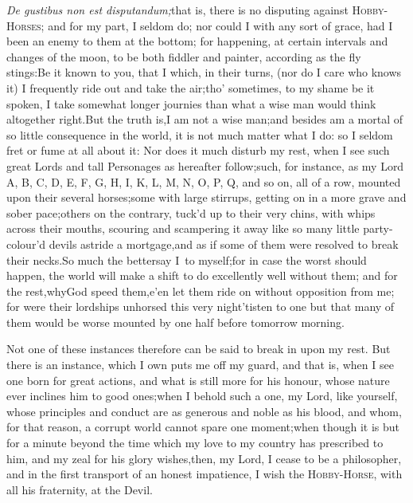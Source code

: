 \documentclass{article}
\begin{document}
\quad\tsk \textit{De gustibus non est
disputandum;}\break\tsk  that is, there is no disputing against
\textsc{Hobby-Horses}; and for my part, I
seldom do; nor could I with any sort of grace, had I been an enemy
to them at the bottom; for happening, at certain intervals and
changes of the moon, to be both fiddler and painter, according as
the fly stings:\tsk  Be it known to you, that I
which, in their turns, (nor do I care who knows
it) I frequently ride out and take 
the air;\tsk  tho’ sometimes, to my shame\break
be it spoken, I take somewhat longer\break
journies than what a wise man would\break
think altogether right.\tsk  But the truth\break
is,\tsk  I am not a wise man;\tsk  and besides am a mortal of so little consequence in the world,
it is not much matter what I do: so I seldom fret or fume at all
about it: Nor does it much disturb my rest, when I see such great
Lords and tall Personages as hereafter follow;\tsk  such, for
instance, as my Lord A, B, C, D, E, F, G, H, I, K, L, M, N, O, P,
Q, and so on, all of a row, mounted upon their several
horses;\tsk  some with large stirrups, getting on in a more grave
and sober pace;\tsh  others on the contrary, tuck’d up to
their very chins, with whips across their mouths, scouring and
scampering it away like so many little party-colour’d devils
astride a mortgage,\tsh  and as if\break
some of them were resolved to break\break
their necks.\tsh  So much the better\tsk  say\break
I~to myself;\tsk  for in case the worst should happen, the world will
make a shift to do excellently well without them; and for the
rest,\tsh  why\tsh  God speed
them,\tsk  e’en let them ride on without opposition
from me; for were their lordships unhorsed this very
night\tsk  ’tis\break ten to one but that many of them would
be worse mounted by one half before tomorrow
morning.

Not one of these instances therefore can be said to break in upon my rest.\tsk\break
But there is an instance, which I own puts me off my guard, and that is, when I see
one born for great actions, and what is still more for his honour,
whose nature ever inclines him to good ones;\tsh\break  when I behold such a one, my
Lord, like yourself, whose principles and conduct are as generous and noble as his
blood, and whom, for that reason, a corrupt world cannot spare one moment;\tsk  when
 though it is but for a minute beyond the
time which my love to my country has prescribed to him, and my zeal for his glory
wishes,\tsk  then, my Lord, I cease to be a philosopher, and in the first transport
of an honest impatience, I wish the \textsc{Hobby-Horse}, with all his fraternity,
at the Devil.
\end{document}
